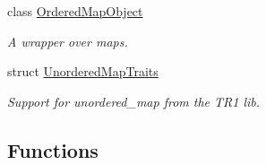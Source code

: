 \begin{DoxyCompactItemize}
class \mbox{\hyperlink{classADAT_1_1OrderedMapObject}{Ordered\+Map\+Object}}
\begin{DoxyCompactList}\small\item\em A wrapper over maps. \end{DoxyCompactList}\item 
struct \mbox{\hyperlink{structADAT_1_1UnorderedMapTraits}{Unordered\+Map\+Traits}}
\begin{DoxyCompactList}\small\item\em Support for unordered\+\_\+map from the T\+R1 lib. \end{DoxyCompactList}\end{DoxyCompactItemize}
\subsection*{Functions}
